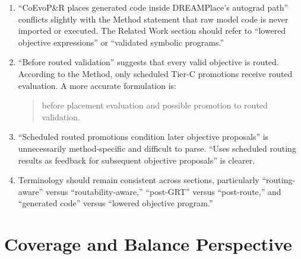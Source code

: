 \documentclass[11pt]{article}
\begin{document}
\begin{enumerate}
  \item ``CoEvoP\&R places generated code inside DREAMPlace's autograd path''
  conflicts slightly with the Method statement that raw model code is never
  imported or executed. The Related Work section should refer to ``lowered
  objective expressions'' or ``validated symbolic programs.''

  \item ``Before routed validation'' suggests that every valid objective is
  routed. According to the Method, only scheduled Tier-C promotions receive
  routed evaluation. A more accurate formulation is:

  \begin{quote}
  before placement evaluation and possible promotion to routed validation.
  \end{quote}

  \item ``Scheduled routed promotions condition later objective proposals'' is
  unnecessarily method-specific and difficult to parse. ``Uses scheduled
  routing results as feedback for subsequent objective proposals'' is clearer.

  \item Terminology should remain consistent across sections, particularly
  ``routing-aware'' versus ``routability-aware,'' ``post-GRT'' versus
  ``post-route,'' and ``generated code'' versus ``lowered objective program.''
\end{enumerate}

\section{Coverage and Balance Perspective}
\end{document}
